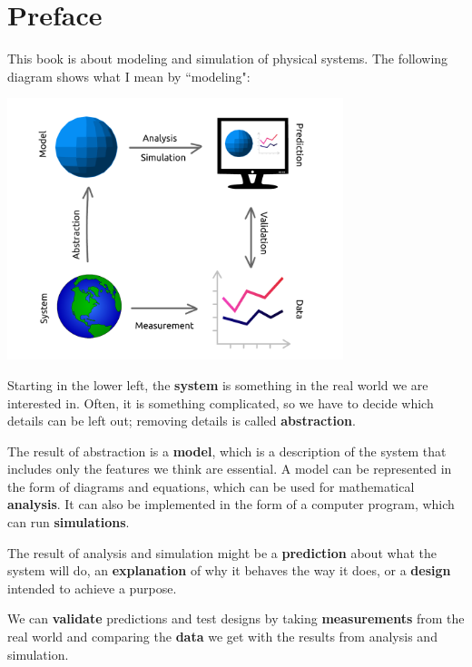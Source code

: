 \documentclass[12pt]{book}
\theoremstyle{exercise}
\begin{document}
\fi

\chapter{Preface}
\label{preface}

This book is about modeling and simulation of physical systems.  
The following diagram shows what I mean by ``modeling":


\vspace{0.2in}
\centerline{\includegraphics[height=3in]{figs/modeling_framework.pdf}}

Starting in the lower left, the {\bf system} is something in the real world we are interested in.  Often, it is something complicated, so we have to decide which details can be left out; removing details is called {\bf abstraction}.


The result of abstraction is a {\bf model}, which is a description of the system that includes only the features we think are essential.  A model can be represented in the form of diagrams and equations, which can be used for mathematical {\bf analysis}.  It can also be implemented in the form of a computer program, which can run {\bf simulations}.


The result of analysis and simulation might be a {\bf prediction} about what the system will do, an {\bf explanation} of why it behaves the way it does, or a {\bf design} intended to achieve a purpose.


We can {\bf validate} predictions and test designs by taking {\bf measurements} from the real world and comparing the {\bf data} we get with the results from analysis and simulation. 
\end{document}
